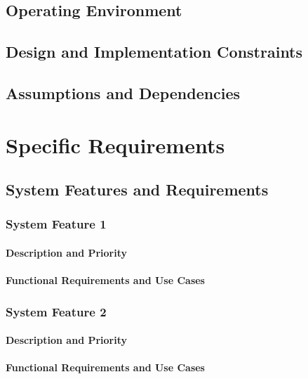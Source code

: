 \documentclass{article}
\begin{document}
\subsection{Operating Environment}

\subsection{Design and Implementation Constraints}

\subsection{Assumptions and Dependencies}

\section{Specific Requirements}

\subsection{System Features and Requirements}

\subsubsection{System Feature 1}

\paragraph{Description and Priority}

\paragraph{Functional Requirements and Use Cases}

\subsubsection{System Feature 2}

\paragraph{Description and Priority}

\paragraph{Functional Requirements and Use Cases}
\end{document}
